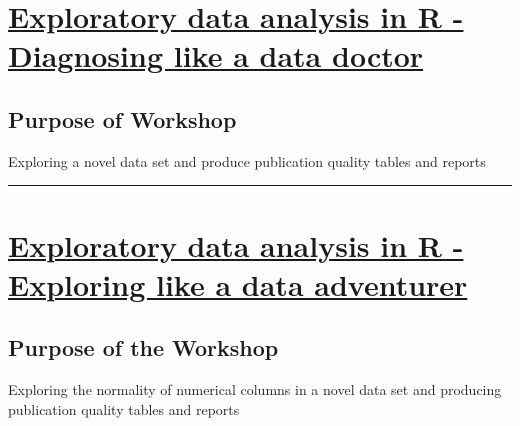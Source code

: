 \documentclass[
  letterpaper,
  DIV=11,
  numbers=noendperiod]{scrreprt}
\begin{document}
\hypertarget{exploratory-data-analysis-in-r---diagnosing-like-a-data-doctor}{%
\section*{\texorpdfstring{\href{https://github.com/Gchism94/Data7_EDA_In_R_Workshops/tree/main/EDA_In_R_Summer1}{Exploratory
data analysis in R - Diagnosing like a data
doctor}}{Exploratory data analysis in R - Diagnosing like a data doctor}}\label{exploratory-data-analysis-in-r---diagnosing-like-a-data-doctor}}

\hypertarget{purpose-of-workshop}{%
\subsection*{Purpose of Workshop}\label{purpose-of-workshop}}

Exploring a novel data set and produce publication quality tables and
reports

\begin{center}\rule{0.5\linewidth}{0.5pt}\end{center}

\hypertarget{exploratory-data-analysis-in-r---exploring-like-a-data-adventurer}{%
\section*{\texorpdfstring{\href{https://github.com/Gchism94/Data7_EDA_In_R_Workshops/tree/main/EDA_In_R_Summer2}{Exploratory
data analysis in R - Exploring like a data
adventurer}}{Exploratory data analysis in R - Exploring like a data adventurer}}\label{exploratory-data-analysis-in-r---exploring-like-a-data-adventurer}}

\hypertarget{purpose-of-the-workshop}{%
\subsection*{Purpose of the Workshop}\label{purpose-of-the-workshop}}

Exploring the normality of numerical columns in a novel data set and
producing publication quality tables and reports
\end{document}

